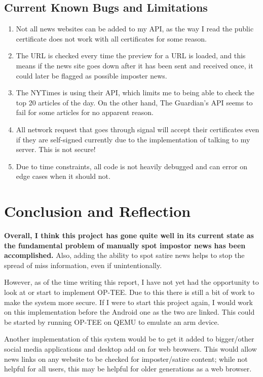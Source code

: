 \documentclass[11pt,a4paper]{report}
\begin{document}
\subsection{Current Known Bugs and Limitations}
\begin{enumerate}
  \item Not all news websites can be added to my API, as the way I read the public certificate does not work with all certificates for some reason.
  \item The URL is checked every time the preview for a URL is loaded, and this means if the news site goes down after it has been sent and received once, it could later be flagged as possible imposter news.
  \item The NYTimes is using their API, which limits me to being able to check the top 20 articles of the day. On the other hand, The Guardian’s API seems to fail for some articles for no apparent reason.
  \item All network request that goes through signal will accept their certificates even if they are self-signed currently due to the implementation of talking to my server. This is not secure!
  \item Due to time constraints, all code is not heavily debugged and can error on edge cases when it should not.
\end{enumerate}
\newpage
\section{Conclusion and Reflection}
\textbf{Overall, I think this project has gone quite well in its current state as the fundamental problem of manually spot impostor news has been accomplished.} Also, adding the ability to spot satire news helps to stop the spread of miss information, even if unintentionally.

However, as of the time writing this report, I have not yet had the opportunity to look at or start to implement OP-TEE. Due to this there is still a bit of work to make the system more secure. If I were to start this project again, I would work on this implementation before the Android one as the two are linked. This could be started by running OP-TEE on QEMU to emulate an arm device.

Another implementation of this system would be to get it added to bigger/other social media applications and desktop add on for web browsers. This would allow news links on any website to be checked for imposter/satire content; while not helpful for all users, this may be helpful for older generations as a web browser.
\end{document}
